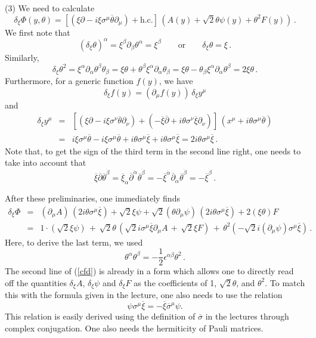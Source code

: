 \documentclass[12pt]{article}
\newcommand{\be}{\begin{equation}}
\newcommand{\ee}{\end{equation}}
\newcommand{\bea}{\begin{eqnarray}}
\newcommand{\eea}{\end{eqnarray}}
\newcommand{\ol}{\overline}
\numberwithin{equation}{section}
\begin{document}
\noindent
(3) We need to calculate
\be
\delta_\xi\Phi(y,\theta)=[(\xi\partial-i\xi\sigma^\mu\ol{\theta}\partial_\mu) + \mbox{h.c.}]\,(A(y)+\sqrt{2}\theta\psi(y)+\theta^2 F(y))\,.
\ee
We first note that
\be
(\delta_\xi\theta)^\alpha=\xi^\beta\partial_\beta\theta^\alpha=\xi^\beta\qquad
\mbox{or}\qquad \delta_\xi\theta=\xi\,.
\ee
Similarly,
\be
\delta_\xi\theta^2=\xi^\alpha\partial_\alpha\theta^\beta\theta_\beta=
\xi\theta+\theta^\beta\xi^\alpha\partial_\alpha\theta_\beta = \xi\theta-
\theta_\beta\xi^\alpha\partial_\alpha\theta^\beta=2\xi\theta\,.
\ee
Furthermore, for a generic function $f(y)$, we have
\be
\delta_\xi f(y)=(\partial_\mu f(y))\,\delta_\xi y^\mu
\ee
and
\bea
\delta_\xi y^\mu&=& [(\xi\partial-i\xi\sigma^\nu\ol{\theta}\partial_\nu)
+(-\ol{\xi}\ol{\partial}+i\theta\sigma^\nu\ol{\xi}\partial_\nu)]\,(x^\mu+i\theta \sigma^\mu\ol{\theta})
\nonumber \\
&=&i\xi\sigma^\mu\ol{\theta}-i\xi\sigma^\mu\ol{\theta}+i\theta\sigma^\mu \ol{\xi} + i\theta\sigma^\mu \ol{\xi} = 2 i\theta\sigma^\mu \ol{\xi}\,.
\eea
Note that, to get the sign of the third term in the second line right, one needs to take into account that
\be
\ol{\xi}\ol{\partial}\ol{\theta}^{\dot{\beta}}=\ol{\xi}_{\dot{\alpha}} \ol{\partial}^{\dot{\alpha}}\ol{\theta}^{\dot{\beta}}=-\ol{\xi}^{\dot{\alpha}} \ol{\partial}_{\dot{\alpha}}\ol{\theta}^{\dot{\beta}}=-\ol{\xi}^{\dot{\beta}} \,.
\ee

After these preliminaries, one immediately finds
\bea
\delta_\xi \Phi &=& (\partial_\mu A)\,(2i\theta\sigma^\mu\ol{\xi}) +\sqrt{2}\xi\psi + \sqrt{2}(\theta\partial_\mu\psi)\,(2i\theta \sigma^\mu\ol{\xi}) +2(\xi\theta)F
\label{cfd} \\
&=& 1\cdot(\sqrt{2}\xi\psi)\,+\,\sqrt{2}\theta\,(\sqrt{2}i\sigma^\mu\ol{\xi} \partial_\mu A\,+\,\sqrt{2}\xi F)\,+\,\theta^2(-\sqrt{2}i(\partial_\mu\psi) \sigma^\mu\ol{\xi})\,.\nonumber
\eea
Here, to derive the last term, we used
\be
\theta^\alpha\theta^\beta = -\frac{1}{2}\epsilon^{\alpha\beta}\theta^2\,.
\label{tde}
\ee
The second line of (\ref{cfd}) is already in a form which allows one to directly read off the quantities $\delta_\xi A$, $\delta_\xi \psi$ and $\delta_\xi F$ as the coefficients of 1, $\sqrt{2}\theta$, and $\theta^2$. To match this with the formula given in the lecture, one also needs to use the relation 
\be
\psi\sigma^\mu\ol{\xi}=-\ol{\xi}\ol{\sigma}^\mu\psi. 
\ee
This relation is easily derived using the definition of $\ol{\sigma}$ in the lectures through complex conjugation. One also needs the hermiticity of Pauli matrices. 
\end{document}
